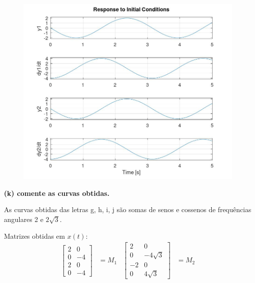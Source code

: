 \documentclass[11pt]{article}
\begin{document}
\begin{center}
  \begin{figure}[h]
    \centering
    \includegraphics[scale=0.5]{plot2j.jpg}
  \end{figure}
\end{center}

\textbf{(k) comente as curvas obtidas.}

As curvas obtidas das letras g, h, i, j são somas de senos e cossenos de frequências angulares 2 e $2\sqrt{3}$.

Matrizes obtidas em $x(t)$:
\begin{align*}
  \begin{bmatrix}
    2 & 0\\
    0 & -4\\
    2 & 0\\
    0 & -4
  \end{bmatrix} &= M_1
  &
  \begin{bmatrix}
    2 & 0\\
    0 & -4\sqrt{3}\\
    -2 & 0\\
    0 & 4\sqrt{3}
  \end{bmatrix} &= M_2
\end{align*}
\end{document}
